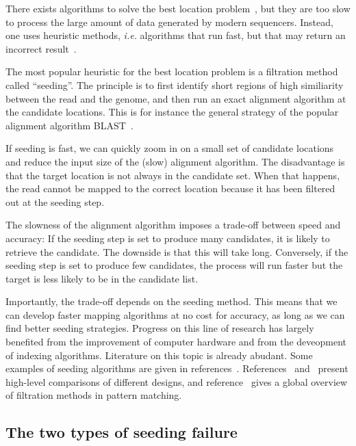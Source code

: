 \documentclass{article}
\begin{document}
There exists algorithms to solve the best location
problem~\cite{pmid7265238,pmid5420325}, but they are too slow to process
the large amount of data generated by modern sequencers. Instead, one uses
heuristic methods, \textit{i.e.} algorithms that run fast, but that may
return an incorrect result~\cite{Waterman1984}.

The most popular heuristic for the best location problem is a filtration
method called ``seeding''. The principle is to first identify short
regions of high similiarity between the read and the genome, and then run
an exact alignment algorithm at the candidate locations. This is for
instance the general strategy of the popular alignment algorithm
BLAST~\cite{pmid2231712}.

If seeding is fast, we can quickly zoom in on a small set of candidate
locations and reduce the input size of the (slow) alignment algorithm. The
disadvantage is that the target location is not always in the candidate
set. When that happens, the read cannot be mapped to the correct location
because it has been filtered out at the seeding step.

The slowness of the alignment algorithm imposes a trade-off between speed
and accuracy: If the seeding step is set to produce many candidates, it is
likely to retrieve the candidate. The downside is that this will take
long. Conversely, if the seeding step is set to produce few candidates,
the process will run faster but the target is less likely to be in the
candidate list.

Importantly, the trade-off depends on the seeding method. This means that
we can develop faster mapping algorithms at no cost for accuracy, as long
as we can find better seeding strategies. Progress on this line of
research has largely benefited from the improvement of computer hardware
and from the deveopment of indexing algorithms. Literature on this topic
is already abudant. Some examples of seeding algorithms are given in
references~\cite{sun2005designing,pmid11934743,xu2006optimizing,
pmid17044164,brejova2003vector,pmid18684737,pmid15359419}.
References~\cite{pmid16533404} and~\cite{pmid20460430} present high-level
comparisons of different designs, and reference~\cite{navarro2001guided}
gives a global overview of filtration methods in pattern matching.

\subsection{The two types of seeding failure}
\end{document}
